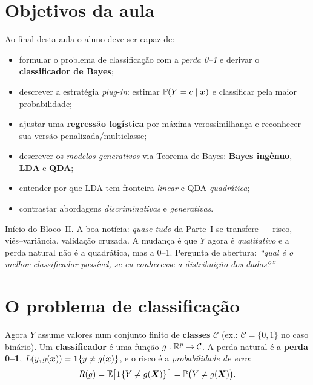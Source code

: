 \documentclass[11pt,a4paper]{article}
\begin{document}

\section*{Objetivos da aula}
Ao final desta aula o aluno deve ser capaz de:
\begin{itemize}[leftmargin=1.4cm]
  \item formular o problema de classificação com a \emph{perda 0--1} e derivar o
        \textbf{classificador de Bayes};
  \item descrever a estratégia \emph{plug-in}: estimar $\mathbb{P}(Y=c\mid\bm{x})$ e
        classificar pela maior probabilidade;
  \item ajustar uma \textbf{regressão logística} por máxima verossimilhança e
        reconhecer sua versão penalizada/multiclasse;
  \item descrever os \emph{modelos generativos} via Teorema de Bayes: \textbf{Bayes
        ingênuo}, \textbf{LDA} e \textbf{QDA};
  \item entender por que LDA tem fronteira \emph{linear} e QDA \emph{quadrática};
  \item contrastar abordagens \emph{discriminativas} e \emph{generativas}.
\end{itemize}

\begin{emsala}
Início do Bloco~II. A boa notícia: \emph{quase tudo} da Parte~I se transfere ---
risco, viés--variância, validação cruzada. A mudança é que $Y$ agora é
\emph{qualitativo} e a perda natural não é a quadrática, mas a 0--1. Pergunta de
abertura: \emph{``qual é o melhor classificador possível, se eu conhecesse a
distribuição dos dados?''}
\end{emsala}

\section{O problema de classificação}
Agora $Y$ assume valores num conjunto finito de \textbf{classes} $\mathcal{C}$ (ex.:
$\mathcal{C}=\{0,1\}$ no caso binário). Um \textbf{classificador} é uma função
$g:\mathbb{R}^p\to\mathcal{C}$. A perda natural é a \textbf{perda 0--1},
$L(y,g(\bm{x}))=\mathbf{1}\!\left\{y\ne g(\bm{x})\right\}$, e o risco é a \emph{probabilidade de erro}:
\begin{equation}\label{eq:risco01}
  R(g) = \mathbb{E}\big[\mathbf{1}\!\left\{Y\ne g(\bm{X})\right\}\big] = \mathbb{P}\big(Y\ne g(\bm{X})\big).
\end{equation}
\end{document}
